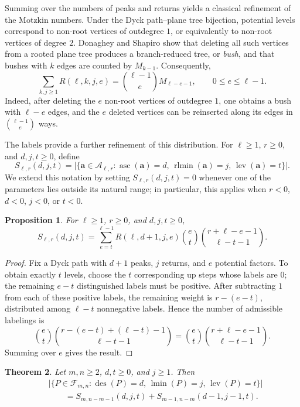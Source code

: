 \documentclass[12pt]{amsart}
\theoremstyle{plain}
\newtheorem{theorem}{Theorem}[section]
\newtheorem{proposition}[theorem]{Proposition}
\theoremstyle{definition}
\DeclareMathOperator{\des}{des}
\newcommand{\F}{{\mathcal F}}
\DeclareMathOperator{\lev}{lev}
\DeclareMathOperator{\asc}{asc}
\DeclareMathOperator{\rlmin}{rlmin}
\DeclareMathOperator{\lmin}{lmin}
\begin{document}
Summing over the numbers of peaks and returns yields a classical
refinement of the Motzkin numbers. Under the Dyck path--plane tree
bijection, potential levels correspond to non-root vertices of
outdegree $1$, or equivalently to non-root vertices of degree $2$.
Donaghey and Shapiro \cite[(M8), Eq.~(19)]{DonagheyShapiro}
show that deleting all such vertices from a rooted plane tree produces
a branch-reduced tree, or \emph{bush}, and that bushes with $k$ edges
are counted by $M_{k-1}$. Consequently,
\[
\sum_{k,j\geq1}R(\ell,k,j,e)
=
\binom{\ell-1}{e}M_{\ell-e-1},
\qquad
0\leq e\leq\ell-1.
\]
Indeed, after deleting the $e$ non-root vertices of outdegree $1$, one
obtains a bush with $\ell-e$ edges, and the $e$ deleted vertices can be
reinserted along its edges in $\binom{\ell-1}{e}$
ways. 

The labels provide a further refinement of this distribution. For
$\ell\geq1$, $r\geq0$, and $d,j,t\geq0$, define
\[
S_{\ell,r}(d,j,t)
=
\bigl|
\{\mathbf a\in\mathcal A_{\ell,r}:
\asc(\mathbf a)=d,\,
\rlmin(\mathbf a)=j,\,
\lev(\mathbf a)=t\}
\bigr|.
\]
We extend this notation by setting $S_{\ell,r}(d,j,t)=0$ whenever one
of the parameters lies outside its natural range; in particular, this
applies when $r<0$, $d<0$, $j<0$, or $t<0$.

\begin{proposition}\label{prop:sequence-three-statistics}
For $\ell\geq1$, $r\geq0$, and $d,j,t\geq0$,
\[
S_{\ell,r}(d,j,t)
=
\sum_{e=t}^{\ell-1}
R(\ell,d+1,j,e)
\binom{e}{t}
\binom{r+\ell-e-1}{\ell-t-1}.
\]
\end{proposition}

\begin{proof}
Fix a Dyck path with $d+1$ peaks, $j$ returns, and $e$ potential
factors. To obtain exactly $t$ levels, choose the $t$ corresponding up
steps whose labels are $0$; the remaining $e-t$ distinguished labels
must be positive. After subtracting $1$ from each of these positive
labels, the remaining weight is $r-(e-t)$, distributed among
$\ell-t$ nonnegative labels. Hence the number of admissible labelings is
\[
\binom{e}{t}
\binom{r-(e-t)+(\ell-t)-1}{\ell-t-1}
=
\binom{e}{t}
\binom{r+\ell-e-1}{\ell-t-1}.
\]
Summing over $e$ gives the result.
\end{proof}

\begin{theorem}\label{thm:three-statistics-polyominoes}
Let $m,n\geq2$, $d,t\geq0$, and $j\geq1$. Then
\begin{align*}
&\bigl|
\{P\in\F_{m,n}:
\des(P)=d,\,
\lmin(P)=j,\,
\lev(P)=t\}
\bigr|\\
&\qquad =
S_{m,n-m-1}(d,j,t)
+
S_{m-1,n-m}(d-1,j-1,t).
\end{align*}
\end{theorem}
\end{document}
